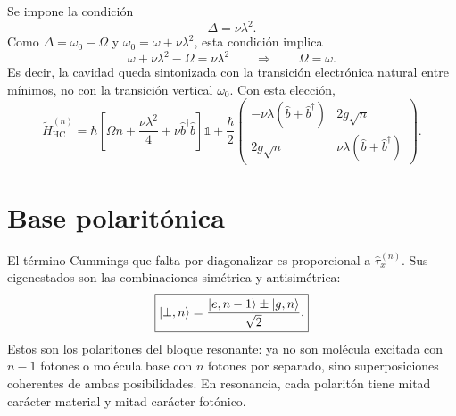 \documentclass[11pt]{article}
\newcommand{\bdag}{\hat b^\dagger}
\begin{document}
Se impone la condici\'on
\begin{equation}
  \Delta=\nu\lambda^2.
\end{equation}
Como $\Delta=\omega_0-\Omega$ y $\omega_0=\omega+\nu\lambda^2$, esta condici\'on
implica
\begin{equation}
  \omega+\nu\lambda^2-\Omega=\nu\lambda^2
  \qquad\Rightarrow\qquad
  \Omega=\omega.
\end{equation}
Es decir, la cavidad queda sintonizada con la transici\'on electr\'onica
natural entre m\'inimos, no con la transici\'on vertical $\omega_0$. Con esta
elecci\'on,
\begin{equation}
  \boxed{
  \tilde H_{\mathrm{HC}}^{(n)}
  =
  \hbar
  \left[
  \Omega n+\frac{\nu\lambda^2}{4}
  +
  \nu\bdag\hat b
  \right]\mathds{1}
  +
  \frac{\hbar}{2}
  \begin{pmatrix}
  -\nu\lambda(\hat b+\bdag) & 2g\sqrt n\\
  2g\sqrt n & \nu\lambda(\hat b+\bdag)
  \end{pmatrix}.
  }
\end{equation}

\section{Base polarit\'onica}

El t\'ermino Cummings que falta por diagonalizar es proporcional a
$\hat\tau_x^{(n)}$. Sus eigenestados son las combinaciones sim\'etrica y
antisim\'etrica:
\begin{equation}
  \boxed{
  \ket{\pm,n}
  =
  \frac{\ket{e,n-1}\pm\ket{g,n}}{\sqrt2}.
  }
\end{equation}
Estos son los polaritones del bloque resonante: ya no son mol\'ecula excitada
con $n-1$ fotones o mol\'ecula base con $n$ fotones por separado, sino
superposiciones coherentes de ambas posibilidades. En resonancia, cada
polarit\'on tiene mitad car\'acter material y mitad car\'acter fot\'onico.
\end{document}
